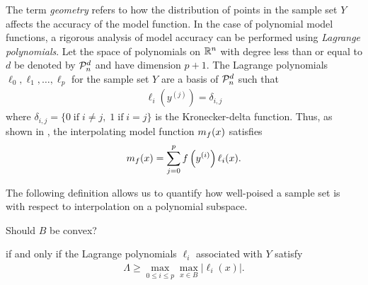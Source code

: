 \documentclass{article}
\begin{document}
\label{geometry}
The term \emph{geometry} refers to  how the distribution of points in the sample set $Y$ affects the accuracy of the model function.     In the case of polynomial model functions, a rigorous analysis of model accuracy can be performed using \emph{Lagrange polynomials}.
Let the space of polynomials on $\mathbb R^n$ with degree less than or equal to $d$ be denoted by $\mathcal{P}^d_n$ and have dimension $p+1$.
The Lagrange polynomials $\ell_0, \ell_1, \ldots, \ell_p$ for the sample set $Y$ are a basis of $\mathcal{P}^d_n$ such that
\begin{align}
\ell_i\left(y^{(j)}\right) = \delta_{i,j}  \label{interpolation_condition_lagrange}
\end{align}
where $\delta_{i,j} = \{0 \;\text{if}\; i\ne j,\; 1 \;\text{if} \; i = j \}$ is the Kronecker-delta function.
Thus, as shown in \cite{introduction_book},  the interpolating model function ${{m}_f}(x)$ 
satisfies
\begin{align}
\label{reg} 
{{m}_f}(x) = \sum^p_{j=0}f\left(y^{(i)}\right)\ell_i(x).
\end{align}

The following definition allows us to quantify how well-poised a sample set is with respect to interpolation on a polynomial subspace.


\color{magenta}
Should $B$ be convex?
\color{black}

\begin{definition}\label{lambda-poised}
if and only if the Lagrange polynomials $\ell_i$ associated with $Y$ satisfy
\begin{align}
\Lambda \ge \max_{0\le i\le p}\max_{x\in B}|\ell_i(x)|.
\end{align}
\end{definition}
\end{document}
